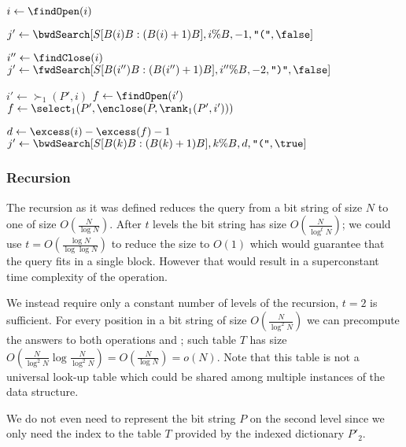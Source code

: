 \begin{algorithm}
\begin{algorithmic}
		\State $i \gets \findOpen(i)$
	\EndIf

	\State $j' \gets \bwdSearch[S[B(i)B : (B(i)+1) B], i \% B, -1, \openingParen, \false]$
		\State {} 
	\EndIf
	
	\State $i'' \gets \findClose(i)$
	\State $j' \gets \fwdSearch[S[B(i'')B : (B(i'')+1) B], i'' \% B, -2, \closingParen, \false]$
		\State {} 
	\EndIf
	
	\State

	\State $i' \gets \succ_1(P', i)$
		\State $f \gets \findOpen(i')$
	\Else
		\State $f \gets \select_1(P', \enclose(P, \rank_1(P', i')))$ 
	\EndIf
	
	\State $d \gets \excess(i) - \excess(f) - 1$
	\State $j' \gets \bwdSearch[S[B(k)B: (B(k) + 1)B], k \% B, d, \openingParen, \true]$
	\State {}
\EndFunction
\end{algorithmic}
\end{algorithm}

\subsubsection{Recursion}

The recursion as it was defined reduces the query from a bit string of size $N$ to one of size $O(\frac{N}{\log N})$.
After $t$ levels the bit string has size $O(\frac{N}{\log^t N})$; we could use $t = O(\frac{\log N}{\log\log N})$ to reduce the size to $O(1)$ which would guarantee that the query fits in a single block.
However that would result in a superconstant time complexity of the operation.

We instead require only a constant number of levels of the recursion, $t = 2$ is sufficient.
For every position in a bit string of size $O(\frac{N}{\log^2 N})$ we can precompute the answers to both operations \match{} and \enclose{}; such table $T$ has size $O(\frac{N}{\log^2 N} \log \frac{N}{\log^2 N}) = O(\frac{N}{\log N}) = o(N)$.
Note that this table is not a universal look-up table which could be shared among multiple instances of the data structure.

We do not even need to represent the bit string $P$ on the second level since we only need the index to the table $T$ provided by the indexed dictionary $P'_2$.

